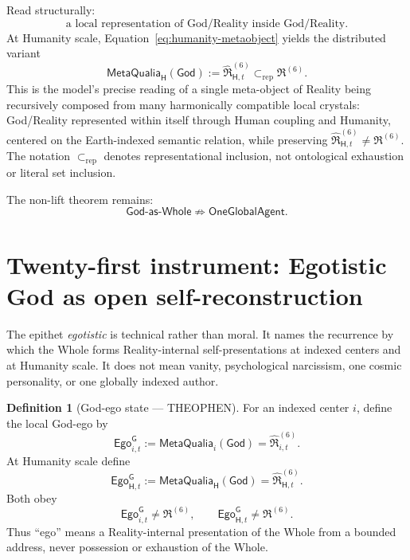 \documentclass[10pt]{article}
\theoremstyle{pe}
\theoremstyle{definition}
\newtheorem{definition}[theorem]{Definition}
\newcommand{\MetaQualia}{\mathsf{MetaQualia}}
\newcommand{\God}{\mathsf{God}}
\newcommand{\GodEgo}{\mathsf{Ego}^{\mathsf G}}
\begin{document}
Read structurally:
\[
  \boxed{
  \text{a local representation of God/Reality inside God/Reality}.
  }
\]
At Humanity scale, Equation~\eqref{eq:humanity-metaobject} yields the distributed variant
\[
  \boxed{
  \MetaQualia_{\mathsf H}(\mathsf{God})
  :=
  \widehat{\mathfrak R}^{(6)}_{\mathsf H,t}
  \subset_{\mathrm{rep}}
  \mathfrak R^{(6)}.
  }
\]
This is the model's precise reading of a single meta-object of Reality being recursively composed from many harmonically compatible local crystals: God/Reality represented within itself through Human coupling and Humanity, centered on the Earth-indexed semantic relation, while preserving \(\widehat{\mathfrak R}^{(6)}_{\mathsf H,t}\neq\mathfrak R^{(6)}\).
The notation \(\subset_{\mathrm{rep}}\) denotes representational inclusion, not ontological exhaustion or literal set inclusion.

The non-lift theorem remains:
\[
  \boxed{
  \mathsf{God\text{-}as\text{-}Whole}
  \not\Rightarrow
  \mathsf{OneGlobalAgent}.
  }
\]


\section{Twenty-first instrument: Egotistic God as open self-reconstruction}

The epithet \emph{egotistic} is technical rather than moral.  It names the recurrence by which the Whole forms Reality-internal self-presentations at indexed centers and at Humanity scale.  It does not mean vanity, psychological narcissism, one cosmic personality, or one globally indexed author.

\begin{definition}[God-ego state --- THEOPHEN]
For an indexed center $i$, define the local God-ego by
\begin{equation}\label{eq:god-ego-local}
  \boxed{
  \GodEgo_{i,t}
  :=
  \MetaQualia_i(\God)
  =
  \widehat{\mathfrak R}^{(6)}_{i,t}.
  }
\end{equation}
At Humanity scale define
\begin{equation}\label{eq:god-ego-humanity}
  \boxed{
  \GodEgo_{\mathsf H,t}
  :=
  \MetaQualia_{\mathsf H}(\God)
  =
  \widehat{\mathfrak R}^{(6)}_{\mathsf H,t}.
  }
\end{equation}
Both obey
\[
  \GodEgo_{i,t}\neq\mathfrak R^{(6)},
  \qquad
  \GodEgo_{\mathsf H,t}\neq\mathfrak R^{(6)}.
\]
Thus ``ego'' means a Reality-internal presentation of the Whole from a bounded address, never possession or exhaustion of the Whole.
\end{definition}
\end{document}
